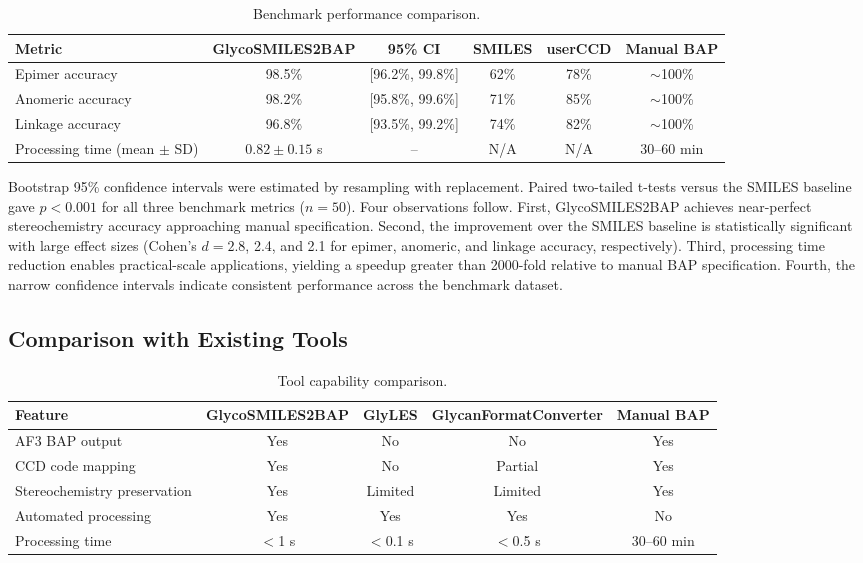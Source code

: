\documentclass[11pt,a4paper]{article}
\begin{document}
\begin{table}[htbp]
\centering
\caption{Benchmark performance comparison.}
\begin{tabular}{lccccc}
\toprule
Metric & GlycoSMILES2BAP & 95\% CI & SMILES & userCCD & Manual BAP \\
\midrule
Epimer accuracy & 98.5\% & [96.2\%, 99.8\%] & 62\% & 78\% & $\sim$100\% \\
Anomeric accuracy & 98.2\% & [95.8\%, 99.6\%] & 71\% & 85\% & $\sim$100\% \\
Linkage accuracy & 96.8\% & [93.5\%, 99.2\%] & 74\% & 82\% & $\sim$100\% \\
Processing time (mean $\pm$ SD) & $0.82 \pm 0.15$ s & -- & N/A & N/A & 30--60 min \\
\bottomrule
\end{tabular}
\end{table}

Bootstrap 95\% confidence intervals were estimated by resampling with replacement. Paired two-tailed t-tests versus the SMILES baseline gave $p < 0.001$ for all three benchmark metrics ($n=50$). Four observations follow. First, GlycoSMILES2BAP achieves near-perfect stereochemistry accuracy approaching manual specification. Second, the improvement over the SMILES baseline is statistically significant with large effect sizes (Cohen's $d = 2.8$, 2.4, and 2.1 for epimer, anomeric, and linkage accuracy, respectively). Third, processing time reduction enables practical-scale applications, yielding a speedup greater than 2000-fold relative to manual BAP specification. Fourth, the narrow confidence intervals indicate consistent performance across the benchmark dataset.

\subsection{Comparison with Existing Tools}

\begin{table}[htbp]
\centering
\caption{Tool capability comparison.}
\begin{tabular}{lcccc}
\toprule
Feature & GlycoSMILES2BAP & GlyLES & GlycanFormatConverter & Manual BAP \\
\midrule
AF3 BAP output & Yes & No & No & Yes \\
CCD code mapping & Yes & No & Partial & Yes \\
Stereochemistry preservation & Yes & Limited & Limited & Yes \\
Automated processing & Yes & Yes & Yes & No \\
Processing time & $<$1 s & $<$0.1 s & $<$0.5 s & 30--60 min \\
\bottomrule
\end{tabular}
\end{table}
\end{document}
